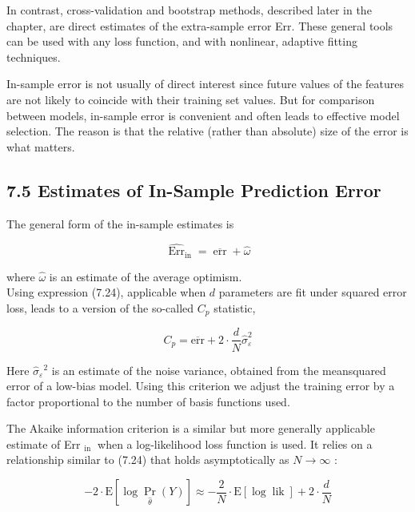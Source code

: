 \documentclass[10pt]{article}
\begin{document}
In contrast, cross-validation and bootstrap methods, described later in the chapter, are direct estimates of the extra-sample error Err. These general tools can be used with any loss function, and with nonlinear, adaptive fitting techniques.

In-sample error is not usually of direct interest since future values of the features are not likely to coincide with their training set values. But for comparison between models, in-sample error is convenient and often leads to effective model selection. The reason is that the relative (rather than absolute) size of the error is what matters.

\subsection*{7.5 Estimates of In-Sample Prediction Error}
The general form of the in-sample estimates is


\begin{equation*}
\widehat{\operatorname{Err}}_{\mathrm{in}}=\overline{\operatorname{err}}+\hat{\omega} \tag{7.25}
\end{equation*}


where $\hat{\omega}$ is an estimate of the average optimism.\\
Using expression (7.24), applicable when $d$ parameters are fit under squared error loss, leads to a version of the so-called $C_{p}$ statistic,


\begin{equation*}
C_{p}=\overline{\mathrm{err}}+2 \cdot \frac{d}{N} \hat{\sigma}_{\varepsilon}^{2} \tag{7.26}
\end{equation*}


Here $\hat{\sigma}_{\varepsilon}{ }^{2}$ is an estimate of the noise variance, obtained from the meansquared error of a low-bias model. Using this criterion we adjust the training error by a factor proportional to the number of basis functions used.

The Akaike information criterion is a similar but more generally applicable estimate of Err $_{\text {in }}$ when a log-likelihood loss function is used. It relies on a relationship similar to (7.24) that holds asymptotically as $N \rightarrow \infty$ :


\begin{equation*}
-2 \cdot \mathrm{E}\left[\log \operatorname{Pr}_{\hat{\theta}}(Y)\right] \approx-\frac{2}{N} \cdot \mathrm{E}[\log \operatorname{lik}]+2 \cdot \frac{d}{N} \tag{7.27}
\end{equation*}
\end{document}
